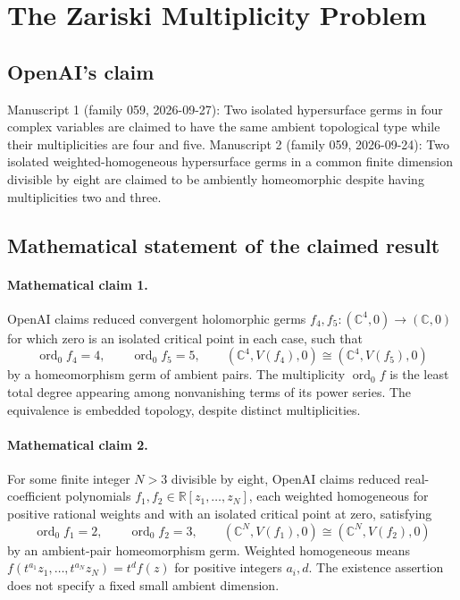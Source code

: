 \documentclass[11pt]{article}
\begin{document}
\section*{The Zariski Multiplicity Problem}

\subsection{OpenAI's claim}
Manuscript 1 (family 059, 2026-09-27): Two isolated hypersurface germs in four complex variables are claimed to have the same ambient topological type while their multiplicities are four and five. Manuscript 2 (family 059, 2026-09-24): Two isolated weighted-homogeneous hypersurface germs in a common finite dimension divisible by eight are claimed to be ambiently homeomorphic despite having multiplicities two and three.

\subsection{Mathematical statement of the claimed result}
\paragraph{Mathematical claim 1.} OpenAI claims reduced convergent holomorphic germs $f_4,f_5:(\mathbb C^4,0)\to(\mathbb C,0)$ for which zero is an isolated critical point in each case, such that
\[
\operatorname{ord}_0f_4=4,\qquad\operatorname{ord}_0f_5=5,\qquad
(\mathbb C^4,V(f_4),0)\cong(\mathbb C^4,V(f_5),0)
\]
by a homeomorphism germ of ambient pairs. The multiplicity $\operatorname{ord}_0f$ is the least total degree appearing among nonvanishing terms of its power series. The equivalence is embedded topology, despite distinct multiplicities.

\paragraph{Mathematical claim 2.} For some finite integer $N>3$ divisible by eight, OpenAI claims reduced real-coefficient polynomials $f_1,f_2\in\mathbb R[z_1,\ldots,z_N]$, each weighted homogeneous for positive rational weights and with an isolated critical point at zero, satisfying
\[
\operatorname{ord}_0f_1=2,\qquad\operatorname{ord}_0f_2=3,\qquad
(\mathbb C^N,V(f_1),0)\cong(\mathbb C^N,V(f_2),0)
\]
by an ambient-pair homeomorphism germ. Weighted homogeneous means $f(t^{a_1}z_1,\ldots,t^{a_N}z_N)=t^df(z)$ for positive integers $a_i,d$. The existence assertion does not specify a fixed small ambient dimension.
\end{document}
